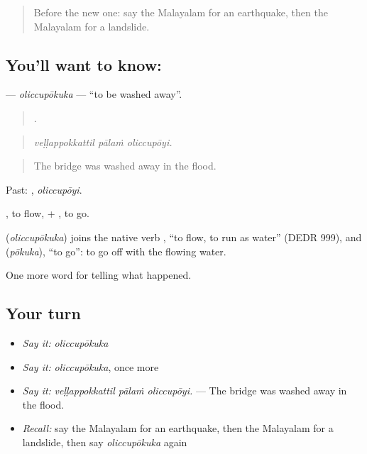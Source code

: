 \label{lesson:ML-C377-oliccupokuka}



\begin{quote}
Before the new one: say the Malayalam for an earthquake, then the Malayalam for a landslide.
\end{quote}

\subsection*{You'll want to know: }
\textbf{} — \emph{oliccupōkuka} — \textquotedblleft{}to be washed away\textquotedblright{}.

\begin{quote}
  .
\end{quote}

\begin{quote}
\emph{veḷḷappokkattil pālaṁ oliccupōyi.}
\end{quote}

\begin{quote}
The bridge was washed away in the flood.
\end{quote}

Past: , \emph{oliccupōyi}.

, to flow, + , to go.

\begin{cousinweb}
\textbf{} (\emph{oliccupōkuka}) joins the native verb , \textquotedblleft{}to flow, to run as water\textquotedblright{} (DEDR 999), and  (\emph{pōkuka}), \textquotedblleft{}to go\textquotedblright{}: to go off with the flowing water.
\end{cousinweb}

\begin{grammarlens}[title={What you've built}]
One more word for telling what happened.
\end{grammarlens}

\subsection*{Your turn}
\begin{itemize}
\raggedright
  \item \emph{Say it:} \emph{oliccupōkuka}
  \item \emph{Say it:} \emph{oliccupōkuka}, once more
  \item \emph{Say it:} \emph{veḷḷappokkattil pālaṁ oliccupōyi.} — The bridge was washed away in the flood.
  \item \emph{Recall:} say the Malayalam for an earthquake, then the Malayalam for a landslide, then say \emph{oliccupōkuka} again
\end{itemize}

